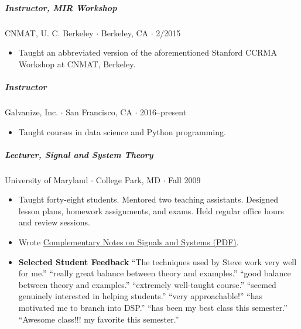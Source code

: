 \documentclass[10pt,letterpaper]{article}
\begin{document}
\subparagraph{Instructor, MIR Workshop} CNMAT, U. C. Berkeley $\cdot$ Berkeley, CA $\cdot$ 2/2015
\begin{itemize}
    \item Taught an abbreviated version of the aforementioned Stanford CCRMA Workshop at CNMAT, Berkeley.
\end{itemize}

\subparagraph{Instructor} Galvanize, Inc. $\cdot$ San Francisco, CA $\cdot$ 2016--present
\begin{itemize}
    \item Taught courses in data science and Python programming.
\end{itemize}

\subparagraph{Lecturer, Signal and System Theory} University of Maryland $\cdot$ College Park, MD $\cdot$ Fall 2009
\begin{itemize}
    \item Taught forty-eight students. Mentored two teaching assistants. Designed lesson plans, homework assignments, and exams. Held regular office hours and review sessions.
    \item Wrote \href{https://stevetjoa.com/static/notes322_20091119.pdf}{Complementary Notes on Signals and Systems (PDF)}.
    \item \textbf{Selected Student Feedback}  ``The techniques used by Steve work very well for me.'' ``really great balance between theory and examples.'' ``good balance between theory and examples.'' ``extremely well-taught course.'' ``seemed genuinely interested in helping students.'' ``very approachable!'' ``has motivated me to branch into DSP.'' ``has been my best class this semester.'' ``Awesome class!!! my favorite this semester.''
\end{itemize}
\end{document}
